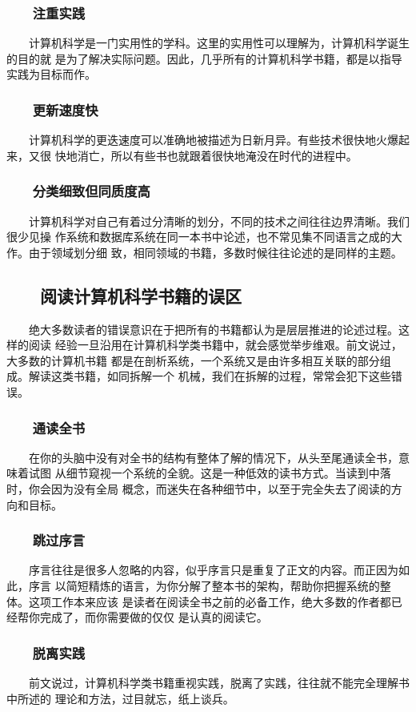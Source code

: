 \documentclass[11pt]{ctexart}
\begin{document}
{{{{\subsubsection{　　注重实践}
\label{sec:org3d8f6bf}
　　计算机科学是一门实用性的学科。这里的实用性可以理解为，计算机科学诞生的目的就
是为了解决实际问题。因此，几乎所有的计算机科学书籍，都是以指导实践为目标而作。
\subsubsection{　　更新速度快}
\label{sec:org4a7ff52}
　　计算机科学的更迭速度可以准确地被描述为日新月异。有些技术很快地火爆起来，又很
快地消亡，所以有些书也就跟着很快地淹没在时代的进程中。
\subsubsection{　　分类细致但同质度高}
\label{sec:orga285fdd}
　　计算机科学对自己有着过分清晰的划分，不同的技术之间往往边界清晰。我们很少见操
作系统和数据库系统在同一本书中论述，也不常见集不同语言之成的大作。由于领域划分细
致，相同领域的书籍，多数时候往往论述的是同样的主题。
\subsection{　　阅读计算机科学书籍的误区}
\label{sec:orge8c28fd}
　　绝大多数读者的错误意识在于把所有的书籍都认为是层层推进的论述过程。这样的阅读
经验一旦沿用在计算机科学类书籍中，就会感觉举步维艰。前文说过，大多数的计算机书籍
都是在剖析系统，一个系统又是由许多相互关联的部分组成。解读这类书籍，如同拆解一个
机械，我们在拆解的过程，常常会犯下这些错误。
\subsubsection{　　通读全书}
\label{sec:org7d8fe30}
　　在你的头脑中没有对全书的结构有整体了解的情况下，从头至尾通读全书，意味着试图
从细节窥视一个系统的全貌。这是一种低效的读书方式。当读到中落时，你会因为没有全局
概念，而迷失在各种细节中，以至于完全失去了阅读的方向和目标。
\subsubsection{　　跳过序言}
\label{sec:org69a9443}
　　序言往往是很多人忽略的内容，似乎序言只是重复了正文的内容。而正因为如此，序言
以简短精炼的语言，为你分解了整本书的架构，帮助你把握系统的整体。这项工作本来应该
是读者在阅读全书之前的必备工作，绝大多数的作者都已经帮你完成了，而你需要做的仅仅
是认真的阅读它。
\subsubsection{　　脱离实践}
\label{sec:org8a7eb6c}
　　前文说过，计算机科学类书籍重视实践，脱离了实践，往往就不能完全理解书中所述的
理论和方法，过目就忘，纸上谈兵。
}}}}
\end{document}
